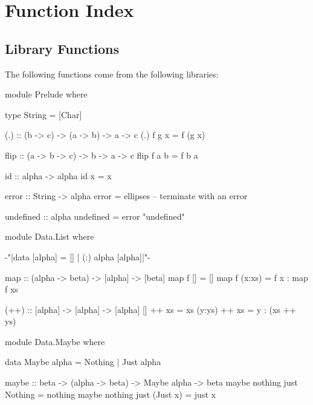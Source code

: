 
\chapter{Function Index}



\printindex


\section{Library Functions}

\begin{comment}
\begin{code}
import Prelude(Char)
ellipses = undefined
\end{code}
\end{comment}


The following functions come from the following libraries:

\begin{code}
module Prelude where

type String = [Char]

(.) :: (b -> c) -> (a -> b) -> a -> c
(.) f g x = f (g x)

flip :: (a -> b -> c) -> b -> a -> c
flip f a b = f b a

id :: alpha -> alpha
id x = x

error :: String -> alpha
error = ellipses -- terminate with an error

undefined :: alpha
undefined = error "undefined"
\end{code}

\begin{code}
module Data.List where

{-"|data [alpha] = [] | (:) alpha [alpha]|"-}

map :: (alpha -> beta) -> [alpha] -> [beta]
map f []      = []
map f (x:xs)  = f x : map f xs

(++) :: [alpha] -> [alpha] -> [alpha]
[] ++ xs = xs
(y:ys) ++ xs = y : (xs ++ ys)
\end{code}


\begin{code}
module Data.Maybe where

data Maybe alpha = Nothing | Just alpha

maybe :: beta -> (alpha -> beta) -> Maybe alpha -> beta
maybe nothing just Nothing   = nothing
maybe nothing just (Just x)  = just x
\end{code}


